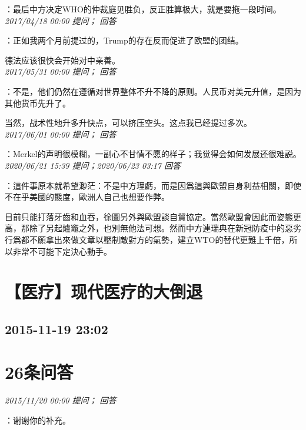 \documentclass[twocolumn]{ctexart}
\begin{document}
：最后中方决定WHO的仲裁庭见胜负，反正胜算极大，就是要拖一段时间。\\

\textit{\hfill\noindent\small 2017/04/18 00:00 提问； 回答}

：正如我两个月前提过的，Trump的存在反而促进了欧盟的团结。

德法应该很快会开始对中亲善。\\

\textit{\hfill\noindent\small 2017/05/31 00:00 提问； 回答}

：不是，他们仍然在遵循对世界整体不升不降的原则。人民币对美元升值，是因为其他货币先升了。

当然，战术性地升多升快点，可以挤压空头。这点我已经提过多次。\\

\textit{\hfill\noindent\small 2017/06/01 00:00 提问； 回答}

：Merkel的声明很模糊，一副心不甘情不愿的样子；我觉得会如何发展还很难説。\\

\textit{\hfill\noindent\small 2020/06/21 15:39 提问；2020/06/23 03:17 回答}

：這件事原本就希望渺茫：不是中方理虧，而是因爲這與歐盟自身利益相關，即使不在乎美國的態度，歐洲人自己也想要作弊。

目前只能打落牙齒和血吞，徐圖另外與歐盟談自貿協定。當然歐盟會因此而姿態更高，那除了另起爐竈之外，也別無他法可想。然而中方連瑞典在新冠防疫中的惡劣行爲都不願拿出來做文章以壓制敵對方的氣勢，建立WTO的替代更難上千倍，所以非常不可能下定決心動手。
\\


\section{【医疗】现代医疗的大倒退}
\subsection{2015-11-19 23:02}


\section{26条问答}

\textit{\hfill\noindent\small 2015/11/20 00:00 提问； 回答}

：谢谢你的补充。\\
\end{document}
